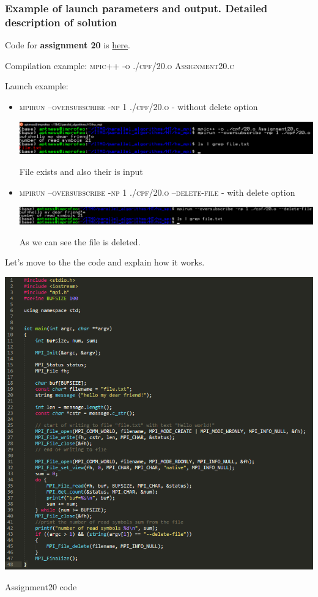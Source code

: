 \documentclass[%
12pt, %
final, %
oneside, %
onecolumn, %
centertags]{article} %
\theoremstyle{plain}
\theoremstyle{definition}
\theoremstyle{remark}
\begin{document}
\subsubsection{Example of launch parameters and output. Detailed description of solution}

Code for \textbf{assignment 20} is \href{https:\//github.com/aptmess/parallel_algorithms/blob/master/HT/hw_mpi/Assignment20.c}{here}.

Compilation example: \textsc{mpic++ -o ./cpf/20.o Assignment20.c}

Launch example: 

\begin{itemize}
	\item \textsc{mpirun --oversubscribe -np 1 ./cpf/20.o} - without delete option
	\begin{center}
	\includegraphics[scale=0.5]{20.no.option.png}

	File exists and also their is input
	\end{center}
	\item \textsc{mpirun --oversubscribe -np 1 ./cpf/20.o --delete-file} - with delete option
	\begin{center}
	\includegraphics[scale=0.45]{20.yes.option.png}

	As we can see the file is deleted.
	\end{center}

\end{itemize}


Let's move to the the code and explain how it works.

\begin{center}
\includegraphics[scale=0.9]{20.png}

Assignment20 code
\end{center}
\end{document}
